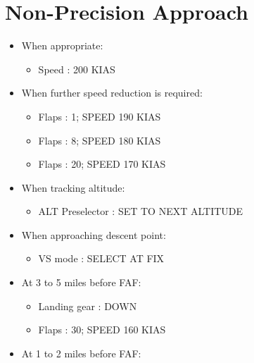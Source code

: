 \section{Non-Precision Approach}
\label{non-precisionapproach}

\begin{itemize}
\item When appropriate:

\begin{itemize}
\item Speed : 200 KIAS

\end{itemize}

\item When further speed reduction is required:

\begin{itemize}
\item Flaps : 1; SPEED 190 KIAS

\item Flaps : 8; SPEED 180 KIAS

\item Flaps : 20; SPEED 170 KIAS

\end{itemize}

\item When tracking altitude:

\begin{itemize}
\item ALT Preselector : SET TO NEXT ALTITUDE

\end{itemize}

\item When approaching descent point:

\begin{itemize}
\item VS mode : SELECT AT FIX

\end{itemize}

\item At 3 to 5 miles before FAF:

\begin{itemize}
\item Landing gear : DOWN

\item Flaps : 30; SPEED 160 KIAS

\end{itemize}

\item At 1 to 2 miles before FAF:


\end{itemize}
